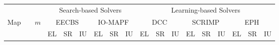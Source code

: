 \begin{table}[t]
  \centering
  \scriptsize
  \setlength{\tabcolsep}{3pt}
  \renewcommand{\arraystretch}{1.1}

  \begin{tabular}{c c c | *{15}{r}}
    \toprule
    & & & \multicolumn{6}{c}{Search-based Solvers} & \multicolumn{9}{c}{Learning-based Solvers} \\
    \cmidrule(lr){4-9} \cmidrule(lr){10-18}
    Map & & $m$ &
    \multicolumn{3}{c}{EECBS} &
    \multicolumn{3}{c}{IO-MAPF} &
    \multicolumn{3}{c}{DCC} &
    \multicolumn{3}{c}{SCRIMP} &
    \multicolumn{3}{c}{EPH} \\
    & & &
    EL & SR & IU &
    EL & SR & IU &
    EL & SR & IU &
    EL & SR & IU &
    EL & SR & IU \\
    \midrule


\end{tabular}
\end{table}
